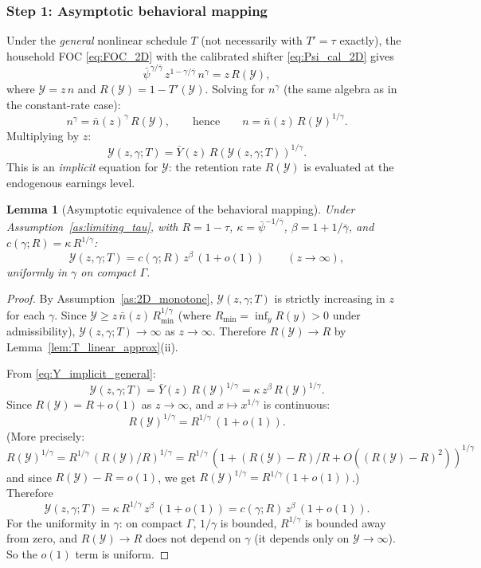 \documentclass[12pt,a4paper]{article}
\theoremstyle{definition}
\theoremstyle{plain}
\newtheorem{lemma}{Lemma}[section]
\theoremstyle{remark}
\newcommand{\calY}{\mathcal{Y}}
\begin{document}
\subsubsection{Step 1: Asymptotic behavioral mapping}
\label{sec:step1_asymp}

Under the \emph{general} nonlinear schedule $T$ (not necessarily with $T' = \tau$ exactly), the household FOC \eqref{eq:FOC_2D} with the calibrated shifter \eqref{eq:Psi_cal_2D} gives
\begin{equation}
\label{eq:Psi_FOC_expanded}
  \bar\psi^{\gamma/\bar\gamma}\,z^{1-\gamma/\bar\gamma}\,n^{\gamma} = z\,R(\calY),
\end{equation}
where $\calY = z\,n$ and $R(\calY) = 1 - T'(\calY)$.  Solving for $n^{\gamma}$ (the same algebra as in the constant-rate case):
\[
  n^{\gamma} = \bar{n}(z)^{\gamma}\,R(\calY), \qquad \text{hence} \qquad n = \bar{n}(z)\,R(\calY)^{1/\gamma}.
\]
Multiplying by $z$:
\begin{equation}
\label{eq:Y_implicit_general}
  \calY(z,\gamma;T) = \bar{Y}(z)\,R(\calY(z,\gamma;T))^{1/\gamma}.
\end{equation}
This is an \emph{implicit} equation for $\calY$: the retention rate $R(\calY)$ is evaluated at the endogenous earnings level.

\begin{lemma}[Asymptotic equivalence of the behavioral mapping]
\label{lem:Y_asymptotic}
Under Assumption~\ref{as:limiting_tau}, with $R = 1 - \tau$,
$\kappa = \bar\psi^{-1/\bar\gamma}$, $\beta = 1+1/\bar\gamma$,
and $c(\gamma;R) = \kappa\,R^{1/\gamma}$:
\begin{equation}
\label{eq:Y_asymp_equiv}
  \calY(z,\gamma;T) = c(\gamma;R)\,z^{\beta}\,(1 + o(1)) \qquad (z \to \infty),
\end{equation}
uniformly in $\gamma$ on compact $\Gamma$.
\end{lemma}

\begin{proof}
By Assumption~\ref{as:2D_monotone}, $\calY(z,\gamma;T)$ is strictly increasing in $z$ for each $\gamma$.  Since $\calY \geq z\,\bar{n}(z)\,R_{\min}^{1/\gamma}$ (where $R_{\min} = \inf_y R(y) > 0$ under admissibility), $\calY(z,\gamma;T) \to \infty$ as $z \to \infty$.  Therefore $R(\calY) \to R$ by Lemma~\ref{lem:T_linear_approx}(ii).

From \eqref{eq:Y_implicit_general}:
\[
  \calY(z,\gamma;T) = \bar{Y}(z)\,R(\calY)^{1/\gamma} = \kappa\,z^{\beta}\,R(\calY)^{1/\gamma}.
\]
Since $R(\calY) = R + o(1)$ as $z \to \infty$, and $x \mapsto x^{1/\gamma}$ is continuous:
\[
  R(\calY)^{1/\gamma} = R^{1/\gamma}\,(1 + o(1)).
\]
(More precisely: $R(\calY)^{1/\gamma} = R^{1/\gamma}\,(R(\calY)/R)^{1/\gamma} = R^{1/\gamma}\,(1 + (R(\calY) - R)/R + O((R(\calY)-R)^2))^{1/\gamma}$ and since $R(\calY) - R = o(1)$, we get $R(\calY)^{1/\gamma} = R^{1/\gamma}(1 + o(1))$.)  Therefore
\[
  \calY(z,\gamma;T) = \kappa\,R^{1/\gamma}\,z^{\beta}\,(1 + o(1)) = c(\gamma;R)\,z^{\beta}\,(1 + o(1)).
\]
For the uniformity in $\gamma$: on compact $\Gamma$, $1/\gamma$ is bounded, $R^{1/\gamma}$ is bounded away from zero, and $R(\calY) \to R$ does not depend on $\gamma$ (it depends only on $\calY \to \infty$).  So the $o(1)$ term is uniform.
\end{proof}
\end{document}
